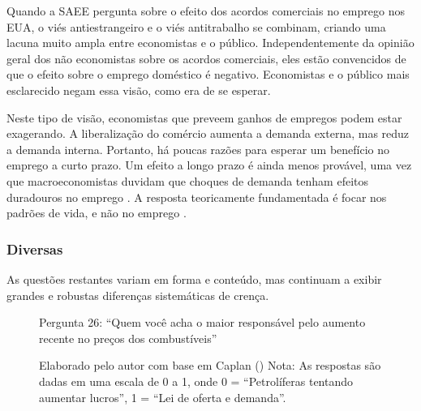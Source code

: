 Quando a SAEE pergunta sobre o efeito dos acordos comerciais no emprego nos EUA, o viés antiestrangeiro e o viés antitrabalho se combinam, criando uma lacuna muito ampla entre economistas e o público. Independentemente da opinião geral dos não economistas sobre os acordos comerciais, eles estão convencidos de que o efeito sobre o emprego doméstico é negativo. Economistas e o público mais esclarecido negam essa visão, como era de se esperar.

Neste tipo de visão, economistas que preveem ganhos de empregos podem estar exagerando. A liberalização do comércio aumenta a demanda externa, mas reduz a demanda interna. Portanto, há poucas razões para esperar um benefício no emprego a curto prazo. Um efeito a longo prazo é ainda menos provável, uma vez que macroeconomistas duvidam que choques de demanda tenham efeitos duradouros no emprego \cite{blinder1987hard}. A resposta teoricamente fundamentada é focar nos padrões de vida, e não no emprego \cite{The_Myth_of_the_Rational_Voter}. 

\subsubsection{Diversas}

As questões restantes variam em forma e conteúdo, mas continuam a exibir grandes e robustas diferenças sistemáticas de crença.

\begin{figure}[H]
    \centering
    \caption*{Pergunta 26: “Quem você acha o maior responsável pelo aumento recente no preços dos combustíveis”}
    \caption{Elaborado pelo autor com base em Caplan (\citeyear{The_Myth_of_the_Rational_Voter}) \newline
    Nota: As respostas são dadas em uma escala de 0 a 1, onde 0 = “Petrolíferas tentando aumentar lucros”, 1 = “Lei de oferta e demanda”.}
    \label{fig:pergunta_26}
\end{figure}

